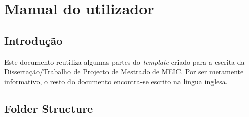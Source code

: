 % 
%  
%
\chapter{Manual do utilizador}
\label{cha:users_manual}

\section{Introdução}
\label{sec:introduction}
Este documento reutiliza algumas partes do \textit{template} criado para a escrita da Dissertação/Trabalho de Projecto de Mestrado de MEIC. Por ser meramente informativo, o resto do documento encontra-se escrito na lingua inglesa.

\section{Folder Structure}
\label{sec:folder_structure}

